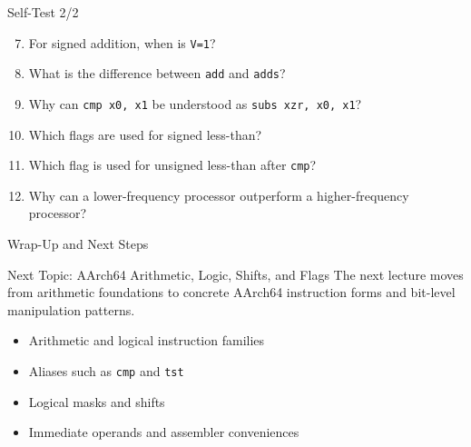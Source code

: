 \documentclass[aspectratio=169,11pt,t]{beamer}
\newcommand{\code}[1]{\texttt{#1}}
\begin{document}

\begin{frame}{Self-Test 2/2}
\begin{enumerate}
\setcounter{enumi}{6}
\item For signed addition, when is \code{V=1}?
\item What is the difference between \code{add} and \code{adds}?
\item Why can \code{cmp x0, x1} be understood as \code{subs xzr, x0, x1}?
\item Which flags are used for signed less-than?
\item Which flag is used for unsigned less-than after \code{cmp}?
\item Why can a lower-frequency processor outperform a higher-frequency processor?
\end{enumerate}
\end{frame}











\begin{frame}{Wrap-Up and Next Steps}
\begin{block}{Next Topic: AArch64 Arithmetic, Logic, Shifts, and Flags}
The next lecture moves from arithmetic foundations to concrete AArch64 instruction forms and bit-level manipulation patterns.
\end{block}
\vspace{0.25cm}
\begin{itemize}o
\item Arithmetic and logical instruction families
\item Aliases such as \code{cmp} and \code{tst}
\item Logical masks and shifts
\item Immediate operands and assembler conveniences
\end{itemize}
\end{frame}
\end{document}
